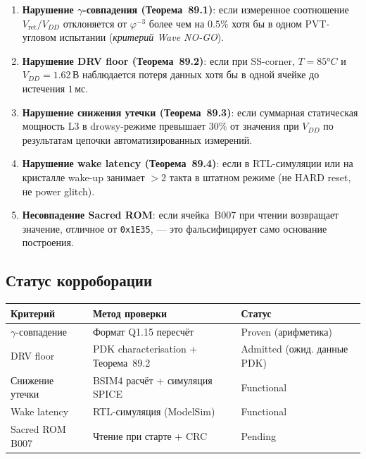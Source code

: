 \begin{enumerate}
  \item \textbf{Нарушение $\gamma$-совпадения (Теорема~89.1)}:
        если измеренное соотношение $V_\mathrm{ret}/V_{DD}$
        отклоняется от $\varphi^{-3}$ более чем на $0.5\%$
        хотя бы в одном PVT-угловом испытании
        (\textit{критерий Wave NO-GO}).
  \item \textbf{Нарушение DRV floor (Теорема~89.2)}:
        если при SS-corner, $T = 85°C$ и $V_{DD} = 1.62\,\text{В}$
        наблюдается потеря данных хотя бы в одной ячейке
        до истечения $1\,\text{мс}$.
  \item \textbf{Нарушение снижения утечки (Теорема~89.3)}:
        если суммарная статическая мощность L3 в drowsy-режиме
        превышает $30\%$ от значения при $V_{DD}$
        по результатам цепочки автоматизированных измерений.
  \item \textbf{Нарушение wake latency (Теорема~89.4)}:
        если в RTL-симуляции или на кристалле
        wake-up занимает $> 2$ такта в штатном режиме
        (не HARD reset, не power glitch).
  \item \textbf{Несовпадение Sacred ROM}:
        если ячейка~B007 при чтении возвращает
        значение, отличное от \texttt{0x1E35},
        — это фальсифицирует само основание построения.
\end{enumerate}

\subsection*{Статус корроборации}

\begin{center}
\begin{tabular}{|l|l|l|}
  \hline
  \textbf{Критерий} & \textbf{Метод проверки} & \textbf{Статус} \\
  \hline
  $\gamma$-совпадение & Формат Q1.15 пересчёт & Proven (арифметика) \\
  DRV floor & PDK characterisation + Теорема~89.2 & Admitted (ожид. данные PDK) \\
  Снижение утечки & BSIM4 расчёт + симуляция SPICE & Functional \\
  Wake latency & RTL-симуляция (ModelSim) & Functional \\
  Sacred ROM B007 & Чтение при старте + CRC & Pending \\
  \hline
\end{tabular}
\end{center}

